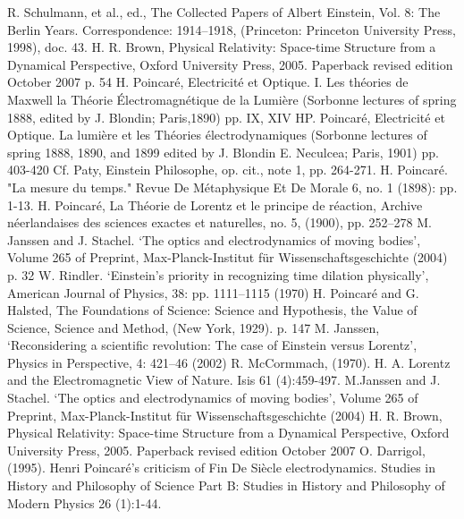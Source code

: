 \documentclass{article}
\begin{document}
\begin{thebibliography}{99}
R. Schulmann, et al., ed., The Collected Papers of Albert Einstein, Vol. 8: The Berlin Years. Correspondence: 1914–1918, (Princeton: Princeton University Press, 1998), doc. 43.
H. R. Brown, Physical Relativity: Space-time Structure from a Dynamical Perspective, Oxford University Press, 2005. Paperback revised edition October 2007 p. 54
H. Poincaré, Electricité et Optique. I. Les théories de Maxwell la Théorie Électromagnétique de la Lumière  (Sorbonne lectures of spring 1888, edited by J. Blondin; Paris,1890) pp. IX, XIV
HP. Poincaré, Electricité et Optique. La lumière et les Théories électrodynamiques (Sorbonne lectures of spring 1888, 1890, and 1899 edited by J. Blondin E. Neculcea; Paris, 1901) pp. 403-420
Cf. Paty, Einstein Philosophe, op. cit., note 1, pp. 264-271.
H. Poincaré. "La mesure du temps." Revue De Métaphysique Et De Morale 6, no. 1 (1898): pp. 1-13.
H. Poincaré, La Théorie de Lorentz et le principe de réaction, Archive néerlandaises des sciences exactes et naturelles, no. 5, (1900), pp. 252–278
M. Janssen and J. Stachel. ‘The optics and electrodynamics of moving bodies’, Volume 265 of Preprint, Max-Planck-Institut für Wissenschaftsgeschichte (2004) p. 32
W. Rindler. ‘Einstein’s priority in recognizing time dilation physically’, American Journal of Physics, 38: pp. 1111–1115 (1970)
H. Poincaré and G. Halsted, The Foundations of Science: Science and Hypothesis, the Value of Science, Science and Method, (New York, 1929). p. 147
M. Janssen, ‘Reconsidering a scientific revolution: The case of Einstein versus Lorentz’, Physics in Perspective, 4: 421–46 (2002)
R. McCormmach, (1970). H. A. Lorentz and the Electromagnetic View of Nature. Isis 61 (4):459-497.
 M.Janssen and J. Stachel. ‘The optics and electrodynamics of moving bodies’, Volume 265 of Preprint, Max-Planck-Institut für Wissenschaftsgeschichte (2004)
H. R. Brown, Physical Relativity: Space-time Structure from a Dynamical Perspective, Oxford University Press, 2005. Paperback revised edition October 2007
O. Darrigol, (1995). Henri Poincaré's criticism of Fin De Siècle electrodynamics. Studies in History and Philosophy of Science Part B: Studies in History and Philosophy of Modern Physics 26 (1):1-44.

\end{thebibliography}
\end{document}
